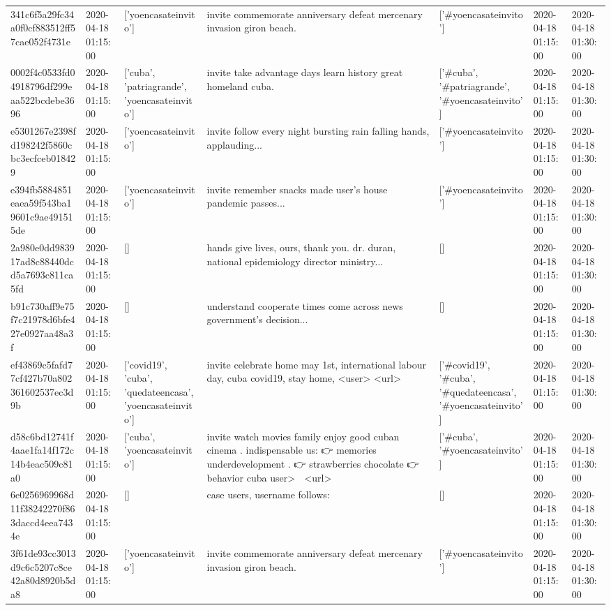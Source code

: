 \begin{tabular}{lllllll}
341c6f5a29fc34a0f0cf883512ff57cae052f4731e & 2020-04-18 01:15:00 & ['yoencasateinvito'] & invite commemorate anniversary defeat mercenary invasion giron beach. & ['#yoencasateinvito'] & 2020-04-18 01:15:00 & 2020-04-18 01:30:00 \\
0002f4c0533fd04918796df299eaa522bcdebe3696 & 2020-04-18 01:15:00 & ['cuba', 'patriagrande', 'yoencasateinvito'] & invite take advantage days learn history great homeland cuba. & ['#cuba', '#patriagrande', '#yoencasateinvito'] & 2020-04-18 01:15:00 & 2020-04-18 01:30:00 \\
e5301267e2398fd198242f5860cbc3ecfceb018429 & 2020-04-18 01:15:00 & ['yoencasateinvito'] & invite follow every night bursting rain falling hands, applauding... & ['#yoencasateinvito'] & 2020-04-18 01:15:00 & 2020-04-18 01:30:00 \\
e394fb5884851eaea59f543ba19601c9ae491515de & 2020-04-18 01:15:00 & ['yoencasateinvito'] & invite remember snacks made user's house pandemic passes... & ['#yoencasateinvito'] & 2020-04-18 01:15:00 & 2020-04-18 01:30:00 \\
2a980e0dd983917ad8c88440dcd5a7693c811ca5fd & 2020-04-18 01:15:00 & [] & hands give lives, ours, thank you. dr. duran, national epidemiology director ministry... & [] & 2020-04-18 01:15:00 & 2020-04-18 01:30:00 \\
b91c730aff9e75f7c21978d6bfe427e0927aa48a3f & 2020-04-18 01:15:00 & [] & understand cooperate times come across news government's decision... & [] & 2020-04-18 01:15:00 & 2020-04-18 01:30:00 \\
ef43869c5fafd77cf427b70a802361602537ec3d9b & 2020-04-18 01:15:00 & ['covid19', 'cuba', 'quedateencasa', 'yoencasateinvito'] & invite celebrate home may 1st, international labour day, cuba covid19, stay home, <user> <url> & ['#covid19', '#cuba', '#quedateencasa', '#yoencasateinvito'] & 2020-04-18 01:15:00 & 2020-04-18 01:30:00 \\
d58c6bd12741f4aae1fa14f172c14b4eac509c81a0 & 2020-04-18 01:15:00 & ['cuba', 'yoencasateinvito'] & invite watch movies family enjoy good cuban cinema ️. indispensable us: 👉 memories underdevelopment . 👉 strawberries chocolate 👉 behavior cuba user> 👏 <url> & ['#cuba', '#yoencasateinvito'] & 2020-04-18 01:15:00 & 2020-04-18 01:30:00 \\
6e0256969968d11f38242270f863daccd4eea7434e & 2020-04-18 01:15:00 & [] & case users, username follows: & [] & 2020-04-18 01:15:00 & 2020-04-18 01:30:00 \\
3f61de93cc3013d9c6c5207c8ce42a80d8920b5da8 & 2020-04-18 01:15:00 & ['yoencasateinvito'] & invite commemorate anniversary defeat mercenary invasion giron beach. & ['#yoencasateinvito'] & 2020-04-18 01:15:00 & 2020-04-18 01:30:00 \\

\end{tabular}
